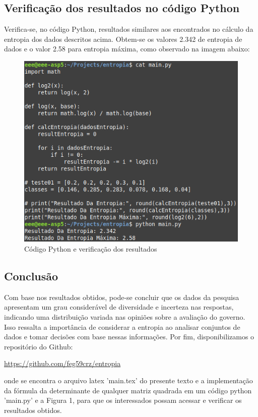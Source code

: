 \documentclass[12pt, a4paper]{article}
\begin{document}
\subsection{Verificação dos resultados no código Python}
Verifica-se, no código Python, resultados similares aos encontrados no cálculo da entropia dos dados descritos acima. Obtem-se os valores 2.342 de entropia de dados e o valor 2.58 para entropia máxima, como observado na imagem abaixo:
\begin{figure}[h!]
    \caption{Código Python e verificação dos resultados}
    \centering
    \includegraphics[scale=0.6]{console.png}
\end{figure}
\subsection{Conclusão}
Com base nos resultados obtidos, pode-se concluir que os dados da pesquisa apresentam um grau considerável de diversidade e incerteza nas respostas, indicando uma distribuição variada nas opiniões sobre a avaliação do governo. Isso ressalta a importância de considerar a entropia ao analisar conjuntos de dados e tomar decisões com base nessas informações. Por fim, disponibilizamos o repositório do Github: 
\begin{center}
\url{ https://github.com/feg59crz/entropia}
\end{center}
onde se encontra o arquivo latex 'main.tex' do presente texto e a implementação da fórmula da determinante de qualquer matriz quadrada em um código python 'main.py' e a Figura 1, para que os interessados possam acessar e verificar os resultados obtidos.
\end{document}
